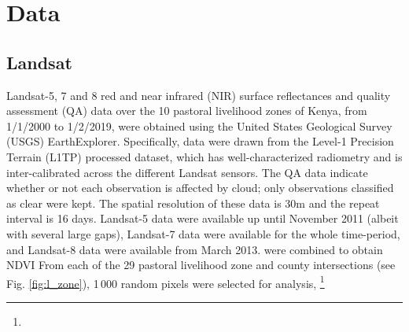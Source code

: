 \documentclass[review]{elsarticle}
\begin{document}
\section{Data} \label{sec:data}


\subsection{Landsat}
Landsat-5, 7 and 8 \citep{royetal} red and near infrared (NIR) surface reflectances and quality assessment (QA) data over the 10 pastoral livelihood zones of Kenya, from 1/1/2000 to 1/2/2019, were obtained using the United States Geological Survey (USGS) EarthExplorer. Specifically, data were drawn from the Level-1 Precision Terrain (L1TP) processed dataset, which has well-characterized radiometry and is inter-calibrated across the different Landsat sensors. The QA data indicate whether or not each observation is affected by cloud; only observations classified as clear were kept. The spatial resolution of these data is 30m and the repeat interval is 16 days. Landsat-5 data were available up until November 2011 (albeit with several large gaps), Landsat-7 data were available for the whole time-period, and Landsat-8 data were available from March 2013. 
 were combined to obtain NDVI  From each of the 29 pastoral livelihood zone and county intersections (see Fig. \ref{fig:l_zone}), 1\,000 random pixels were selected for analysis, \footnote{} 

\end{document}
